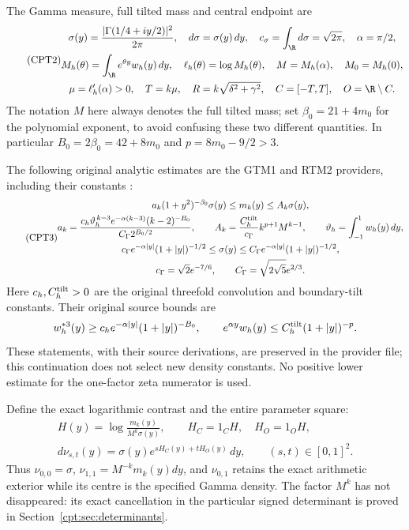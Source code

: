 The Gamma measure, full tilted mass and central endpoint are
\begin{equation}\tag{CPT2}
\begin{gathered}
 \sigma(y)=\frac{|\Gamma(1/4+iy/2)|^2}{2\pi},\quad
 d\sigma=\sigma(y)\,dy,\quad c_\sigma=\int_{\R}d\sigma=\sqrt{2\pi},
 \quad \alpha=\pi/2,\\
 M_h(\theta)=\int_{\R}e^{\theta y}w_h(y)\,dy,\quad
 \ell_h(\theta)=\log M_h(\theta),\quad
 M=M_h(\alpha),\quad M_0=M_h(0),\\
 \mu=\ell_h'(\alpha)>0,\quad T=k\mu,\quad
 R=k\sqrt{\delta^2+\gamma^2},\quad
 C=[-T,T],\quad O=\R\setminus C.
\end{gathered}
\end{equation}
The notation \(M\) here always denotes the full tilted mass; set
\(\beta_0=21+4m_0\) for the polynomial exponent, to avoid confusing
these two different quantities.  In particular \(B_0=2\beta_0=42+8m_0\)
and \(p=8m_0-9/2>3\).

The following original analytic estimates are the GTM1 and RTM2
providers, including their constants \cite{cpt:providers}:
\begin{equation}\tag{CPT3}
\begin{gathered}
 a_k(1+y^2)^{-\beta_0}\sigma(y)\le m_k(y)\le A_k\sigma(y),\\
 a_k=
 \frac{c_h\vartheta_h^{\,k-3}e^{-\alpha(k-3)}(k-2)^{-B_0}}
 {C_\Gamma2^{B_0/2}},\qquad
 A_k=\frac{C_h^{\rm tilt}}{c_\Gamma}k^{p+1}M^{k-1},
 \qquad \vartheta_h=\int_{-1}^1w_h(y)\,dy,\\
 c_\Gamma e^{-\alpha|y|}(1+|y|)^{-1/2}
 \le\sigma(y)\le
 C_\Gamma e^{-\alpha|y|}(1+|y|)^{-1/2},\\
 c_\Gamma=\sqrt2e^{-7/6},\qquad
 C_\Gamma=\sqrt{2\sqrt5}e^{2/3}.
\end{gathered}
\end{equation}
Here \(c_h,C_h^{\rm tilt}>0\) are the original threefold convolution
and boundary-tilt constants.  Their original source bounds are
\[
 w_h^{*3}(y)\ge c_h e^{-\alpha|y|}(1+|y|)^{-B_0},
 \qquad e^{\alpha y}w_h(y)\le
 C_h^{\rm tilt}(1+|y|)^{-p}.
\]
These statements, with their source derivations, are preserved in the
provider file; this continuation does not select new density constants.
No positive lower estimate for the one-factor zeta numerator is used.

Define the exact logarithmic contrast and the entire parameter square:
\begin{equation}\tag{CPT4}
\begin{gathered}
 H(y)=\log\frac{m_k(y)}{M^k\sigma(y)},\qquad
 H_C=1_CH,\quad H_O=1_OH,\\
 d\nu_{s,t}(y)=\sigma(y)e^{sH_C(y)+tH_O(y)}\,dy,
 \qquad (s,t)\in[0,1]^2.
\end{gathered}
\end{equation}
Thus \(\nu_{0,0}=\sigma\), \(\nu_{1,1}=M^{-k}m_k(y)dy\), and
\(\nu_{0,1}\) retains the exact arithmetic exterior while its centre is
the specified Gamma density.  The factor \(M^k\) has not disappeared:
its exact cancellation in the particular signed determinant is proved
in Section~\ref{cpt:sec:determinants}.

